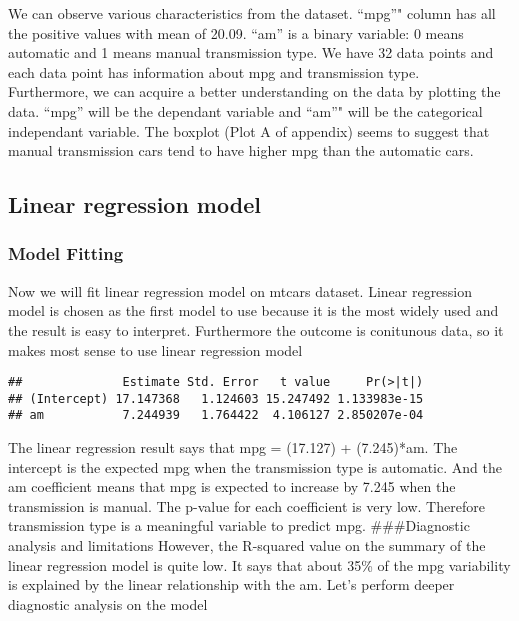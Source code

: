 \documentclass[]{article}
\newenvironment{Shaded}{\begin{snugshade}}{\end{snugshade}}
\newcommand{\KeywordTok}[1]{\textcolor[rgb]{0.13,0.29,0.53}{\textbf{#1}}}
\newcommand{\StringTok}[1]{\textcolor[rgb]{0.31,0.60,0.02}{#1}}
\newcommand{\CommentTok}[1]{\textcolor[rgb]{0.56,0.35,0.01}{\textit{#1}}}
\newcommand{\OperatorTok}[1]{\textcolor[rgb]{0.81,0.36,0.00}{\textbf{#1}}}
\newcommand{\NormalTok}[1]{#1}
\begin{document}
We can observe various characteristics from the dataset. ``mpg''" column
has all the positive values with mean of 20.09. ``am'' is a binary
variable: 0 means automatic and 1 means manual transmission type. We
have 32 data points and each data point has information about mpg and
transmission type.\\
Furthermore, we can acquire a better understanding on the data by
plotting the data. ``mpg'' will be the dependant variable and ``am''"
will be the categorical independant variable. The boxplot (Plot A of
appendix) seems to suggest that manual transmission cars tend to have
higher mpg than the automatic cars.

\subsection{Linear regression model}\label{linear-regression-model}

\subsubsection{Model Fitting}\label{model-fitting}

Now we will fit linear regression model on mtcars dataset. Linear
regression model is chosen as the first model to use because it is the
most widely used and the result is easy to interpret. Furthermore the
outcome is conitunous data, so it makes most sense to use linear
regression model

\begin{Shaded}
\end{Shaded}

\begin{verbatim}
##              Estimate Std. Error   t value     Pr(>|t|)
## (Intercept) 17.147368   1.124603 15.247492 1.133983e-15
## am           7.244939   1.764422  4.106127 2.850207e-04
\end{verbatim}

The linear regression result says that mpg = (17.127) + (7.245)*am. The
intercept is the expected mpg when the transmission type is automatic.
And the am coefficient means that mpg is expected to increase by 7.245
when the transmission is manual. The p-value for each coefficient is
very low. Therefore transmission type is a meaningful variable to
predict mpg. \#\#\#Diagnostic analysis and limitations However, the
R-squared value on the summary of the linear regression model is quite
low. It says that about 35\% of the mpg variability is explained by the
linear relationship with the am. Let's perform deeper diagnostic
analysis on the model
\end{document}

